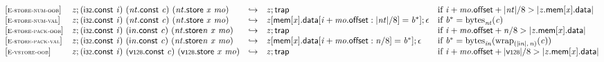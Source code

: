 $$
\begin{array}{@{}l@{}lcl@{}l@{}}
{[\textsc{\scriptsize E{-}store{-}num{-}oob}]} \quad & {\mathit{z}} ; (\mathsf{i{\scriptstyle32}}.\mathsf{const}~{\mathit{i}})~({\mathit{nt}}.\mathsf{const}~{\mathit{c}})~({\mathit{nt}}.\mathsf{store}~{\mathit{x}}~{\mathit{mo}}) &\hookrightarrow& {\mathit{z}} ; \mathsf{trap} &\quad
  \mbox{if}~{\mathit{i}} + {\mathit{mo}}.\mathsf{offset} + {|{\mathit{nt}}|} / 8 > {|{{\mathit{z}}.\mathsf{mem}}{[{\mathit{x}}]}.\mathsf{data}|} \\
{[\textsc{\scriptsize E{-}store{-}num{-}val}]} \quad & {\mathit{z}} ; (\mathsf{i{\scriptstyle32}}.\mathsf{const}~{\mathit{i}})~({\mathit{nt}}.\mathsf{const}~{\mathit{c}})~({\mathit{nt}}.\mathsf{store}~{\mathit{x}}~{\mathit{mo}}) &\hookrightarrow& {\mathit{z}}[\mathsf{mem}[{\mathit{x}}].\mathsf{data}[{\mathit{i}} + {\mathit{mo}}.\mathsf{offset} : {|{\mathit{nt}}|} / 8] = {{\mathit{b}}^\ast}] ; \epsilon &\quad
  \mbox{if}~{{\mathit{b}}^\ast} = {{\mathrm{bytes}}}_{{\mathit{nt}}}({\mathit{c}}) \\
{[\textsc{\scriptsize E{-}store{-}pack{-}oob}]} \quad & {\mathit{z}} ; (\mathsf{i{\scriptstyle32}}.\mathsf{const}~{\mathit{i}})~({\mathsf{i}}{{\mathit{n}}}.\mathsf{const}~{\mathit{c}})~({{\mathit{nt}}.\mathsf{store}}{{\mathit{n}}}~{\mathit{x}}~{\mathit{mo}}) &\hookrightarrow& {\mathit{z}} ; \mathsf{trap} &\quad
  \mbox{if}~{\mathit{i}} + {\mathit{mo}}.\mathsf{offset} + {\mathit{n}} / 8 > {|{{\mathit{z}}.\mathsf{mem}}{[{\mathit{x}}]}.\mathsf{data}|} \\
{[\textsc{\scriptsize E{-}store{-}pack{-}val}]} \quad & {\mathit{z}} ; (\mathsf{i{\scriptstyle32}}.\mathsf{const}~{\mathit{i}})~({\mathsf{i}}{{\mathit{n}}}.\mathsf{const}~{\mathit{c}})~({{\mathit{nt}}.\mathsf{store}}{{\mathit{n}}}~{\mathit{x}}~{\mathit{mo}}) &\hookrightarrow& {\mathit{z}}[\mathsf{mem}[{\mathit{x}}].\mathsf{data}[{\mathit{i}} + {\mathit{mo}}.\mathsf{offset} : {\mathit{n}} / 8] = {{\mathit{b}}^\ast}] ; \epsilon &\quad
  \mbox{if}~{{\mathit{b}}^\ast} = {{\mathrm{bytes}}}_{{{\mathit{i}}}{{\mathit{n}}}}({{{\mathrm{wrap}}}_{({|{\mathsf{i}}{{\mathit{n}}}|},\, {\mathit{n}})}}{({\mathit{c}})}) \\
{[\textsc{\scriptsize E{-}vstore{-}oob}]} \quad & {\mathit{z}} ; (\mathsf{i{\scriptstyle32}}.\mathsf{const}~{\mathit{i}})~(\mathsf{v{\scriptstyle128}}.\mathsf{const}~{\mathit{c}})~(\mathsf{v{\scriptstyle128}.store}~{\mathit{x}}~{\mathit{mo}}) &\hookrightarrow& {\mathit{z}} ; \mathsf{trap} &\quad
  \mbox{if}~{\mathit{i}} + {\mathit{mo}}.\mathsf{offset} + {|\mathsf{v{\scriptstyle128}}|} / 8 > {|{{\mathit{z}}.\mathsf{mem}}{[{\mathit{x}}]}.\mathsf{data}|} \\

\end{array}$$
